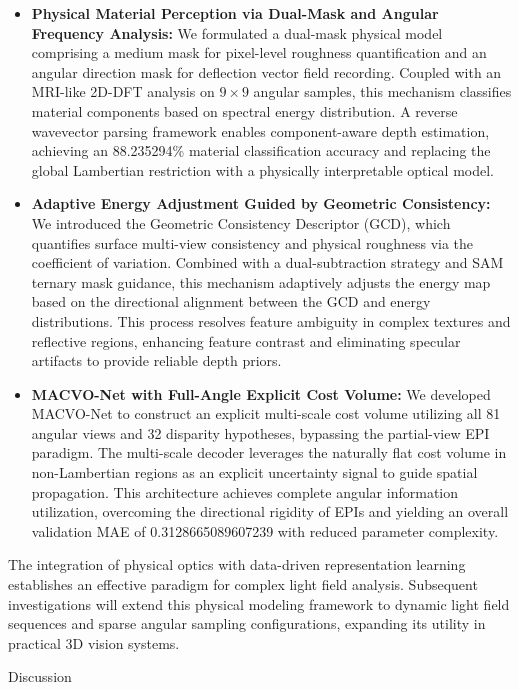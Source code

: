 \documentclass[lettersize,journal]{IEEEtran}
\begin{document}
\begin{itemize}
    \item \textbf{Physical Material Perception via Dual-Mask and Angular Frequency Analysis:} We formulated a dual-mask physical model comprising a medium mask for pixel-level roughness quantification and an angular direction mask for deflection vector field recording. Coupled with an MRI-like 2D-DFT analysis on $9 \times 9$ angular samples, this mechanism classifies material components based on spectral energy distribution. A reverse wavevector parsing framework enables component-aware depth estimation, achieving an 88.235294\% material classification accuracy and replacing the global Lambertian restriction with a physically interpretable optical model.
    \item \textbf{Adaptive Energy Adjustment Guided by Geometric Consistency:} We introduced the Geometric Consistency Descriptor (GCD), which quantifies surface multi-view consistency and physical roughness via the coefficient of variation. Combined with a dual-subtraction strategy and SAM ternary mask guidance, this mechanism adaptively adjusts the energy map based on the directional alignment between the GCD and energy distributions. This process resolves feature ambiguity in complex textures and reflective regions, enhancing feature contrast and eliminating specular artifacts to provide reliable depth priors.
    \item \textbf{MACVO-Net with Full-Angle Explicit Cost Volume:} We developed MACVO-Net to construct an explicit multi-scale cost volume utilizing all 81 angular views and 32 disparity hypotheses, bypassing the partial-view EPI paradigm. The multi-scale decoder leverages the naturally flat cost volume in non-Lambertian regions as an explicit uncertainty signal to guide spatial propagation. This architecture achieves complete angular information utilization, overcoming the directional rigidity of EPIs and yielding an overall validation MAE of 0.3128665089607239 with reduced parameter complexity.
\end{itemize}

The integration of physical optics with data-driven representation learning establishes an effective paradigm for complex light field analysis. Subsequent investigations will extend this physical modeling framework to dynamic light field sequences and sparse angular sampling configurations, expanding its utility in practical 3D vision systems.

Discussion
\end{document}
